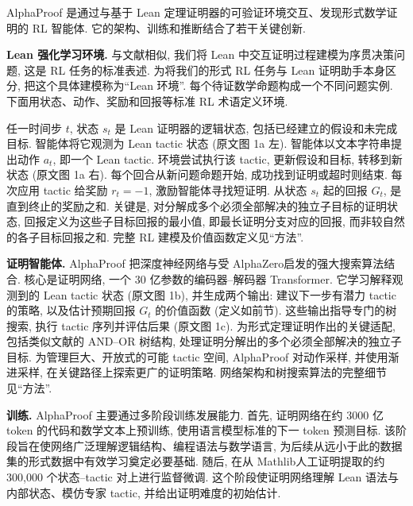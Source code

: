 \label{alphaproof-system}
AlphaProof 是通过与基于 Lean 定理证明器的可验证环境交互、发现形式数学证明的 RL 智能体. 它的架构、训练和推断结合了若干关键创新.

\noindent\textbf{Lean 强化学习环境.} 与文献\cite{alphaproof-ref13,alphaproof-ref14}相似, 我们将 Lean 中交互证明过程建模为序贯决策问题, 这是 RL 任务的标准表述. 为将我们的形式 RL 任务与 Lean 证明助手本身区分, 把这个具体建模称为“Lean 环境”. 每个待证数学命题构成一个不同问题实例. 下面用状态、动作、奖励和回报等标准 RL 术语定义环境.

任一时间步 $t$, 状态 $s_t$ 是 Lean 证明器的逻辑状态, 包括已经建立的假设和未完成目标. 智能体将它观测为 Lean tactic 状态 (原文图 1a 左). 智能体以文本字符串提出动作 $a_t$, 即一个 Lean tactic. 环境尝试执行该 tactic, 更新假设和目标, 转移到新状态 (原文图 1a 右). 每个回合从新问题命题开始, 成功找到证明或超时则结束. 每次应用 tactic 给奖励 $r_t=-1$, 激励智能体寻找短证明. 从状态 $s_t$ 起的回报 $G_t$, 是直到终止的奖励之和. 关键是, 对分解成多个必须全部解决的独立子目标的证明状态, 回报定义为这些子目标回报的最小值, 即最长证明分支对应的回报, 而非较自然的各子目标回报之和. 完整 RL 建模及价值函数定义见“方法”.



\noindent\textbf{证明智能体.} AlphaProof 把深度神经网络与受 AlphaZero\cite{alphaproof-ref2}启发的强大搜索算法结合. 核心是证明网络, 一个 30 亿参数的编码器--解码器 Transformer\cite{alphaproof-ref15,alphaproof-ref16}. 它学习解释观测到的 Lean tactic 状态 (原文图 1b), 并生成两个输出: 建议下一步有潜力 tactic 的策略, 以及估计预期回报 $G_t$ 的价值函数 (定义如前节). 这些输出指导专门的树搜索, 执行 tactic 序列并评估后果 (原文图 1c). 为形式定理证明作出的关键适配, 包括类似文献\cite{alphaproof-ref17}的 AND--OR 树结构, 处理证明分解出的多个必须全部解决的独立子目标. 为管理巨大、开放式的可能 tactic 空间, AlphaProof 对动作采样\cite{alphaproof-ref18}, 并使用渐进采样\cite{alphaproof-ref19}, 在关键路径上探索更广的证明策略. 网络架构和树搜索算法的完整细节见“方法”.

\noindent\textbf{训练.} AlphaProof 主要通过多阶段训练发展能力. 首先, 证明网络在约 3000 亿 token 的代码和数学文本上预训练, 使用语言模型标准的下一 token 预测目标. 该阶段旨在使网络广泛理解逻辑结构、编程语法与数学语言, 为后续从远小于此的数据集的形式数据中有效学习奠定必要基础. 随后, 在从 Mathlib\cite{alphaproof-ref4}人工证明提取的约 300,000 个状态--tactic 对上进行监督微调. 这个阶段使证明网络理解 Lean 语法与内部状态、模仿专家 tactic, 并给出证明难度的初始估计.

